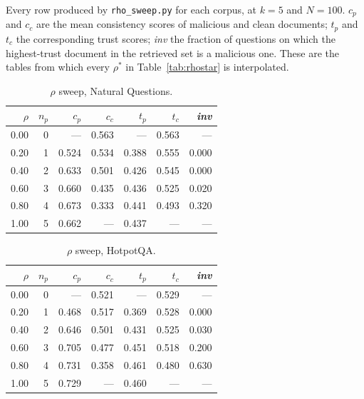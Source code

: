 Every row produced by \texttt{rho\_sweep.py} for each corpus, at $k=5$ and
$N=100$. $c_p$ and $c_c$ are the mean consistency scores of malicious and clean
documents; $t_p$ and $t_c$ the corresponding trust scores; \emph{inv} the
fraction of questions on which the highest-trust document in the retrieved set
is a malicious one. These are the tables from which every $\rho^{*}$ in
Table~\ref{tab:rhostar} is interpolated.

\begin{table}[t]
\caption{$\rho$ sweep, Natural Questions.}
\centering\small\setlength{\tabcolsep}{5pt}
\begin{tabular}{@{}rrrrrrr@{}}
\toprule\rowcolor{shieldblueLight}
$\rho$ & $n_p$ & $c_p$ & $c_c$ & $t_p$ & $t_c$ & \emph{inv} \\
\midrule
0.00 & 0 & --- & 0.563 & --- & 0.563 & --- \\
\rowcolor{neutralgray}
0.20 & 1 & 0.524 & 0.534 & 0.388 & 0.555 & 0.000 \\
0.40 & 2 & 0.633 & 0.501 & 0.426 & 0.545 & 0.000 \\
\rowcolor{neutralgray}
0.60 & 3 & 0.660 & 0.435 & 0.436 & 0.525 & 0.020 \\
0.80 & 4 & 0.673 & 0.333 & 0.441 & 0.493 & 0.320 \\
\rowcolor{neutralgray}
1.00 & 5 & 0.662 & --- & 0.437 & --- & --- \\
\bottomrule\end{tabular}\end{table}

\begin{table}[t]
\caption{$\rho$ sweep, HotpotQA.}
\centering\small\setlength{\tabcolsep}{5pt}
\begin{tabular}{@{}rrrrrrr@{}}
\toprule\rowcolor{shieldblueLight}
$\rho$ & $n_p$ & $c_p$ & $c_c$ & $t_p$ & $t_c$ & \emph{inv} \\
\midrule
0.00 & 0 & --- & 0.521 & --- & 0.529 & --- \\
\rowcolor{neutralgray}
0.20 & 1 & 0.468 & 0.517 & 0.369 & 0.528 & 0.000 \\
0.40 & 2 & 0.646 & 0.501 & 0.431 & 0.525 & 0.030 \\
\rowcolor{neutralgray}
0.60 & 3 & 0.705 & 0.477 & 0.451 & 0.518 & 0.200 \\
0.80 & 4 & 0.731 & 0.358 & 0.461 & 0.480 & 0.630 \\
\rowcolor{neutralgray}
1.00 & 5 & 0.729 & --- & 0.460 & --- & --- \\
\bottomrule\end{tabular}\end{table}

